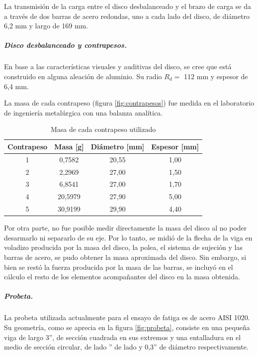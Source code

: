 La transmisión de la carga entre el disco desbalanceado y el brazo de carga se da a través de dos barras de acero redondas, uno a cada lado del disco, de diámetro 6,2 mm y largo de 169 mm.

\subparagraph{Disco desbalanceado y contrapesos.}
En base a las características visuales y auditivas del disco, se cree que está construido en alguna aleación de aluminio. Su radio $R_d =$ 112 mm y espesor de 6,4 mm. 

La masa de cada contrapeso (figura \ref{fig:contrapesos}) fue medida en el laboratorio de ingeniería metalúrgica con una balanza analítica.
\begin{table}[H]
\centering
\begin{tabular}{@{}cccc@{}}
\toprule
Contrapeso & Masa {[}g{]}	& Diámetro {[}mm{]}	&	Espesor {[}mm{]} \\ \midrule
1          & 0,7582			& 20,55				&	1,00	         \\
2          & 2,2969       	& 27,00				&	1,50			 \\
3          & 6,8541       	& 27,00				& 	1,70			 \\
4          & 20,5979      	& 27,90				& 	5,00			 \\
5          & 30,9199      	& 29,90				&	4,40			 \\ \bottomrule
\end{tabular}
\caption{Masa de cada contrapeso utilizado}
\label{tab:masa_contrapesos}
\end{table}

Por otra parte, no fue posible medir directamente la masa del disco al no poder desarmarlo ni separarlo de su eje. Por lo tanto, se midió de la flecha de la viga en voladizo producida por la masa del disco, la polea, el sistema de sujeción y las barras de acero, se pudo obtener la masa aproximada del disco. Sin embargo, si bien se restó la fuerza producida por la masa de las barras, se incluyó en el cálculo el resto de los elementos acompañantes del disco en la masa obtenida.

\subparagraph{Probeta.} La probeta utilizada actualmente para el ensayo de fatiga es de acero AISI 1020. Su geometría, como se aprecia en la figura \ref{fig:probeta}, consiste en una pequeña viga de largo 3'', de sección cuadrada en sus extremos y una entalladura en el medio de sección circular, de lado '' de lado y 0,3'' de diámetro respectivamente.
 

